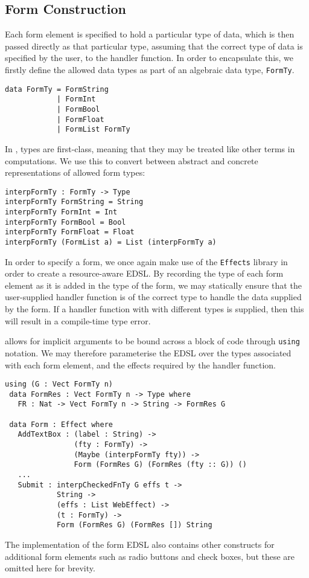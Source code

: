 \documentclass[preprint]{sigplanconf}
\begin{document}
\subsection{Form Construction}
Each form element is specified to hold a particular type of data, which is then passed directly as that particular type, assuming that the correct type of data is specified by the user, to the handler function. In order to encapsulate this, we firstly define the allowed data types as part of an algebraic data type, \texttt{FormTy}.
{\small
\begin{verbatim}
data FormTy = FormString
            | FormInt
            | FormBool
            | FormFloat
            | FormList FormTy 
\end{verbatim}
}
In \idris{}, types are first-class, meaning that they may be treated like other terms in computations. We use this to convert between abstract and concrete representations of allowed form types:
{\small
\begin{verbatim}
interpFormTy : FormTy -> Type
interpFormTy FormString = String
interpFormTy FormInt = Int
interpFormTy FormBool = Bool
interpFormTy FormFloat = Float
interpFormTy (FormList a) = List (interpFormTy a)
\end{verbatim}
}
%
In order to specify a form, we once again make use of the \texttt{Effects} library in order to create a resource-aware EDSL. By recording the type of each form element as it is added in the type of the form, we may statically ensure that the user-supplied handler function is of the correct type to handle the data supplied by the form. If a handler function with with different types is supplied, then this will result in a compile-time type error.

\idris{} allows for implicit arguments to be bound across a block of code through \texttt{using} notation. We may therefore parameterise the EDSL over the types associated with each form element, and the effects required by the handler function.

{\small
\begin{verbatim}
using (G : Vect FormTy n)
 data FormRes : Vect FormTy n -> Type where
   FR : Nat -> Vect FormTy n -> String -> FormRes G

 data Form : Effect where
   AddTextBox : (label : String) -> 
                (fty : FormTy) -> 
                (Maybe (interpFormTy fty)) -> 
                Form (FormRes G) (FormRes (fty :: G)) () 
   ...
   Submit : interpCheckedFnTy G effs t -> 
            String -> 
            (effs : List WebEffect) -> 
            (t : FormTy) -> 
            Form (FormRes G) (FormRes []) String
\end{verbatim}
}
The implementation of the form EDSL also contains other constructs for additional form elements such as radio buttons and check boxes, but these are omitted here for brevity.
\end{document}
